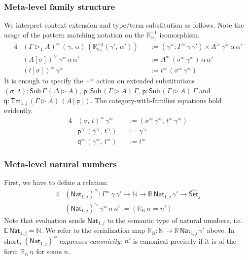 \documentclass[acmsmall,anonymous,review]{acmart}
\newcommand{\msf}[1]{\mathsf{#1}}
\newcommand{\mbb}[1]{\mathbb{#1}}
\newcommand{\wh}[1]{\widehat{#1}}
\newcommand{\ext}{\triangleright}
\newcommand{\Sub}{\msf{Sub}}
\newcommand{\Tm}{\msf{Tm}}
\newcommand{\p}{\mathsf{p}}
\newcommand{\q}{\mathsf{q}}
\newcommand{\Nat}{\msf{Nat}}
\newcommand{\Set}{\mathsf{Set}}
\newcommand{\blank}{{\mathord{\hspace{1pt}\text{--}\hspace{1pt}}}}
\newcommand{\ev}{\mbb{E}}
\newcommand{\re}{\mbb{R}}
\theoremstyle{remark}
\newcommand{\whset}{\wh{\Set}}
\newcommand{\rexti}{\re_{\ext_1}^{-1}}
\newcommand{\rel}{^{\approx}}
\begin{document}
\subsubsection{Meta-level family structure}
We interpret context extension and type/term substitution as follows. Note the
usage of the pattern matching notation on the $\rexti$ isomorphism.
\begin{alignat*}{4}
  & (\Gamma \ext_1 A)\rel\,(\gamma,\,\alpha)\,(\rexti(\gamma',\,\alpha')) && :=
    (\gamma\rel : \Gamma\rel\,\gamma\,\gamma') \times A\rel\,\gamma\rel\,\alpha\,\alpha'\\
  & (A[\sigma])\rel\,\gamma\rel\,\alpha\,\alpha' && := A\rel\,(\sigma\rel\,\gamma\rel)\,\alpha\,\alpha'\\
  & (t[\sigma])\rel\,\gamma\rel\                 && := t\rel\,(\sigma\rel\,\gamma\rel)
\end{alignat*}
It is enough to specify the $\blank\rel$ action on extended substitutions
$(\sigma,\,t) : \Sub\,\Gamma\,(\Delta\ext A)$, $\p : \Sub\,(\Gamma\ext
A)\,\Gamma$, $\p : \Sub\,(\Gamma\ext A)\,\Gamma$ and $\q : \Tm_{1,j}\,(\Gamma
\ext A)\,(A[\p])$. The category-with-families equations hold evidently.
\begin{alignat*}{4}
  & (\sigma,\,t)\rel\,\gamma\rel                 && := (\sigma\rel\,\gamma\rel,\,t\rel\,\gamma\rel)\\
  & \p\rel\,(\gamma\rel,\,t\rel)                 && := \gamma\rel\\
  & \q\rel\,(\gamma\rel,\,t\rel)                 && := t\rel
\end{alignat*}

\subsubsection{Meta-level natural numbers} First, we have to define a relation:
\begin{alignat*}{4}
  & (\Nat_{1,j})\rel : \Gamma\rel\,\gamma\,\gamma' \to \mbb{N} \to \re\,\Nat_{1,j}\,\gamma' \to \whset_j\\
  & (\Nat_{1,j})\rel\,\gamma\rel\,n\,n' := (\re_{\mbb{N}}\,n = n')
\end{alignat*}
Note that evaluation sends $\Nat_{1,j}$ to the semantic type of natural numbers,
i.e.\ $\ev\,\Nat_{1,j} = \mbb{N}$. We refer to the serialization map
$\re_{\mbb{N}} : \mbb{N} \to \re\,\Nat_{1,j}\,\gamma'$ above. In short,
$(\Nat_{1,j})\rel$ expresses \emph{canonicity}: $n'$ is canonical precisely if
it is of the form $\re_{\mbb{N}}\,n$ for some $n$.
\end{document}
